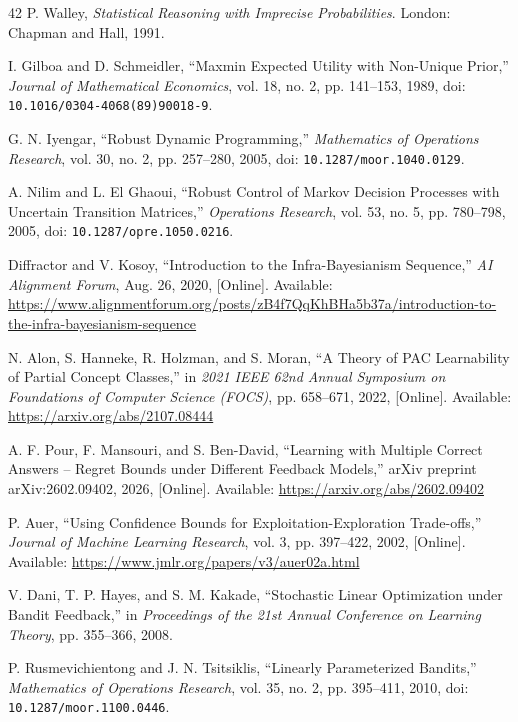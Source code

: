 \begin{thebibliography}{42}
P. Walley, \emph{Statistical Reasoning with Imprecise Probabilities}. London: Chapman and Hall, 1991.

I. Gilboa and D. Schmeidler, ``Maxmin Expected Utility with Non-Unique Prior,'' \emph{Journal of Mathematical Economics}, vol. 18, no. 2, pp. 141--153, 1989, doi: \nolinkurl{10.1016/0304-4068(89)90018-9}.

G. N. Iyengar, ``Robust Dynamic Programming,'' \emph{Mathematics of Operations Research}, vol. 30, no. 2, pp. 257--280, 2005, doi: \nolinkurl{10.1287/moor.1040.0129}.

A. Nilim and L. El Ghaoui, ``Robust Control of Markov Decision Processes with Uncertain Transition Matrices,'' \emph{Operations Research}, vol. 53, no. 5, pp. 780--798, 2005, doi: \nolinkurl{10.1287/opre.1050.0216}.

{\raggedright
Diffractor and V. Kosoy, ``Introduction to the Infra-Bayesianism Sequence,'' \emph{AI Alignment Forum}, Aug. 26, 2020, [Online]. Available: \url{https://www.alignmentforum.org/posts/zB4f7QqKhBHa5b37a/introduction-to-the-infra-bayesianism-sequence}\par}

N. Alon, S. Hanneke, R. Holzman, and S. Moran, ``A Theory of PAC Learnability of Partial Concept Classes,'' in \emph{2021 IEEE 62nd Annual Symposium on Foundations of Computer Science (FOCS)}, pp. 658--671, 2022, [Online]. Available: \url{https://arxiv.org/abs/2107.08444}

A. F. Pour, F. Mansouri, and S. Ben-David, ``Learning with Multiple Correct Answers -- Regret Bounds under Different Feedback Models,'' arXiv preprint arXiv:2602.09402, 2026, [Online]. Available: \url{https://arxiv.org/abs/2602.09402}

P. Auer, ``Using Confidence Bounds for Exploitation-Exploration Trade-offs,'' \emph{Journal of Machine Learning Research}, vol. 3, pp. 397--422, 2002, [Online]. Available: \url{https://www.jmlr.org/papers/v3/auer02a.html}

V. Dani, T. P. Hayes, and S. M. Kakade, ``Stochastic Linear Optimization under Bandit Feedback,'' in \emph{Proceedings of the 21st Annual Conference on Learning Theory}, pp. 355--366, 2008.

P. Rusmevichientong and J. N. Tsitsiklis, ``Linearly Parameterized Bandits,'' \emph{Mathematics of Operations Research}, vol. 35, no. 2, pp. 395--411, 2010, doi: \nolinkurl{10.1287/moor.1100.0446}.


\end{thebibliography}
